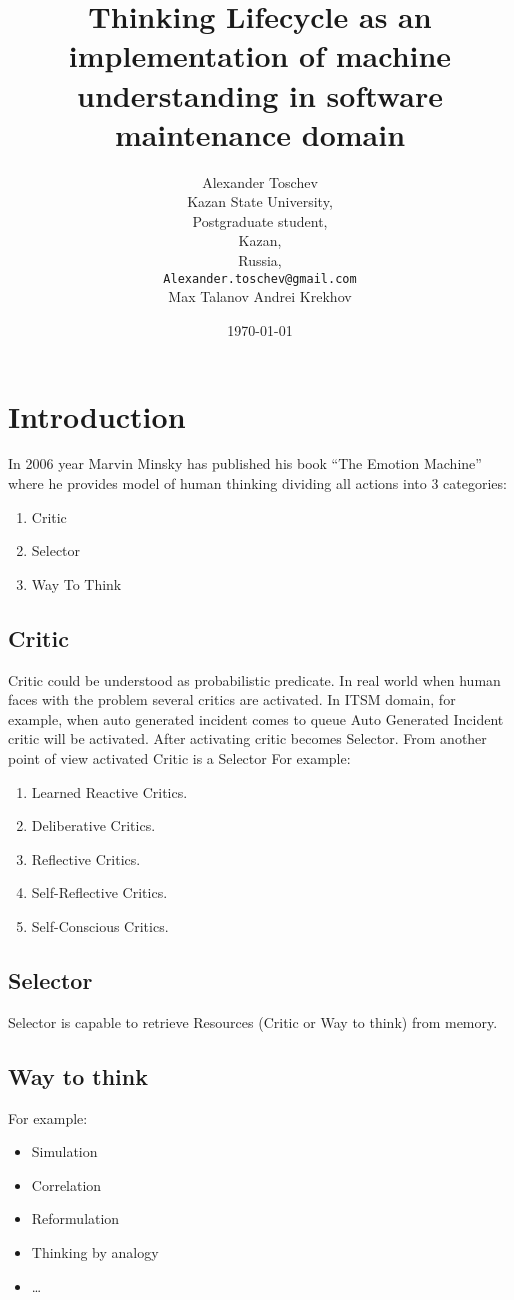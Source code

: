 \documentclass[12pt]{article}
\title{Thinking Lifecycle as an implementation of machine understanding in software maintenance domain}
\author{
Alexander Toschev\\
Kazan State University,\\
Postgraduate student,\\
Kazan,\\
Russia,\\
\texttt{Alexander.toschev@gmail.com}

Max Talanov
Andrei Krekhov}
\date{\today}
\begin{document}
\maketitle

\section{Introduction}
In 2006 year Marvin Minsky has published his book “The Emotion Machine” where he provides model of human thinking dividing all actions into 3 categories:

\begin{enumerate}
 \item Critic
 \item Selector
 \item Way To Think
\end{enumerate}

\subsection{Critic}
Critic could be understood as probabilistic predicate. In real world when human faces with the problem several critics are activated. In ITSM domain, for example, when auto generated incident comes to queue Auto Generated Incident critic will be activated. After activating critic becomes Selector. From another point of view activated Critic is a Selector
For example:

\begin{enumerate}
 \item Learned Reactive Critics.
 \item Deliberative Critics.
 \item Reflective Critics.
 \item Self-Reflective Critics.
 \item Self-Conscious Critics.
\end{enumerate}

\subsection{Selector}
Selector is capable to retrieve Resources (Critic or Way to think) from memory.

\subsection{Way to think}

For example:
\begin{itemize}
 \item Simulation
 \item Correlation
 \item Reformulation
 \item Thinking by analogy
 \item …
\end{itemize}
\end{document}

